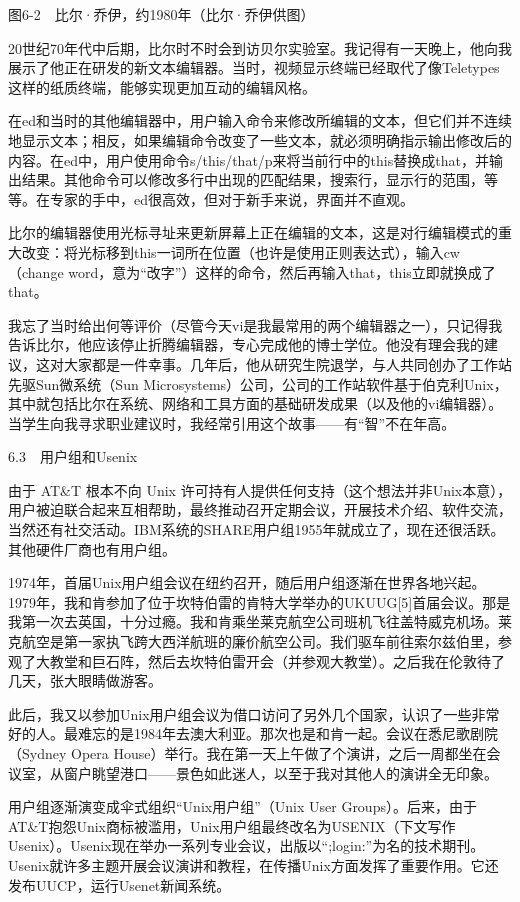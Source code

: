 \documentclass[a4paper,12pt,UTF8,twoside]{ctexbook}
\begin{document}
图6-2　比尔·乔伊，约1980年（比尔·乔伊供图）

20世纪70年代中后期，比尔时不时会到访贝尔实验室。我记得有一天晚上，他向我展示了他正在研发的新文本编辑器。当时，视频显示终端已经取代了像Teletypes这样的纸质终端，能够实现更加互动的编辑风格。

在ed和当时的其他编辑器中，用户输入命令来修改所编辑的文本，但它们并不连续地显示文本；相反，如果编辑命令改变了一些文本，就必须明确指示输出修改后的内容。在ed中，用户使用命令s/this/that/p来将当前行中的this替换成that，并输出结果。其他命令可以修改多行中出现的匹配结果，搜索行，显示行的范围，等等。在专家的手中，ed很高效，但对于新手来说，界面并不直观。

比尔的编辑器使用光标寻址来更新屏幕上正在编辑的文本，这是对行编辑模式的重大改变：将光标移到this一词所在位置（也许是使用正则表达式），输入cw（change word，意为“改字”）这样的命令，然后再输入that，this立即就换成了that。

我忘了当时给出何等评价（尽管今天vi是我最常用的两个编辑器之一），只记得我告诉比尔，他应该停止折腾编辑器，专心完成他的博士学位。他没有理会我的建议，这对大家都是一件幸事。几年后，他从研究生院退学，与人共同创办了工作站先驱Sun微系统（Sun Microsystems）公司，公司的工作站软件基于伯克利Unix，其中就包括比尔在系统、网络和工具方面的基础研发成果（以及他的vi编辑器）。当学生向我寻求职业建议时，我经常引用这个故事——有“智”不在年高。





6.3　用户组和Usenix


由于 AT\&T 根本不向 Unix 许可持有人提供任何支持（这个想法并非Unix本意），用户被迫联合起来互相帮助，最终推动召开定期会议，开展技术介绍、软件交流，当然还有社交活动。IBM系统的SHARE用户组1955年就成立了，现在还很活跃。其他硬件厂商也有用户组。

1974年，首届Unix用户组会议在纽约召开，随后用户组逐渐在世界各地兴起。1979年，我和肯参加了位于坎特伯雷的肯特大学举办的UKUUG[5]首届会议。那是我第一次去英国，十分过瘾。我和肯乘坐莱克航空公司班机飞往盖特威克机场。莱克航空是第一家执飞跨大西洋航班的廉价航空公司。我们驱车前往索尔兹伯里，参观了大教堂和巨石阵，然后去坎特伯雷开会（并参观大教堂）。之后我在伦敦待了几天，张大眼睛做游客。

此后，我又以参加Unix用户组会议为借口访问了另外几个国家，认识了一些非常好的人。最难忘的是1984年去澳大利亚。那次也是和肯一起。会议在悉尼歌剧院（Sydney Opera House）举行。我在第一天上午做了个演讲，之后一周都坐在会议室，从窗户眺望港口——景色如此迷人，以至于我对其他人的演讲全无印象。

用户组逐渐演变成伞式组织“Unix用户组”（Unix User Groups）。后来，由于AT\&T抱怨Unix商标被滥用，Unix用户组最终改名为USENIX（下文写作Usenix）。Usenix现在举办一系列专业会议，出版以“;login:”为名的技术期刊。Usenix就许多主题开展会议演讲和教程，在传播Unix方面发挥了重要作用。它还发布UUCP，运行Usenet新闻系统。
\end{document}
